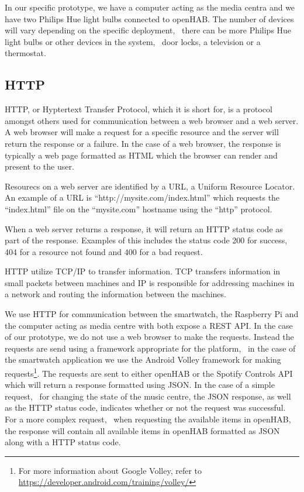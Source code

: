 In our specific prototype, we have a computer acting as the media centra and we have two Philips Hue light bulbs connected to openHAB. The number of devices will vary depending on the specific deployment, \eg~there can be more Philips Hue light bulbs or other devices in the system, \eg~door locks, a television or a thermostat.

\subsection{HTTP}

HTTP, or Hyptertext Transfer Protocol, which it is short for, is a protocol amongst others used for communication between a web browser and a web server. A web browser will make a request for a specific resource and the server will return the response or a failure. In the case of a web browser, the response is typically a web page formatted as HTML which the browser can render and present to the user.

Resourecs on a web server are identified by a URL, a Uniform Resource Locator. An example of a URL is ``http://mysite.com/index.html'' which requests the ``index.html'' file on the ``mysite.com'' hostname using the ``http'' protocol.

When a web server returns a response, it will return an HTTP status code as part of the response. Examples of this includes the status code 200 for success, 404 for a resource not found and 400 for a bad request.

HTTP utilize TCP/IP to transfer information. TCP transfers information in small packets between machines and IP is responsible for addressing machines in a network and routing the information between the machines.

We use HTTP for communication between the smartwatch, the Raspberry Pi and the computer acting as media centre with both expose a REST API. In the case of our prototype, we do not use a web browser to make the requests. Instead the requests are send using a framework appropriate for the platform, \eg~in the case of the smartwatch application we use the Android Volley framework for making requests\footnote{For more information about Google Volley, refer to \url{https://developer.android.com/training/volley/}}.
The requests are sent to either openHAB or the Spotify Controls API which will return a response formatted using JSON. In the case of a simple request, \eg~for changing the state of the music centre, the JSON response, as well as the HTTP status code, indicates whether or not the request was successful. For a more complex request, \eg~when requesting the available items in openHAB, the response will contain all available items in openHAB formatted as JSON along with a HTTP status code.

